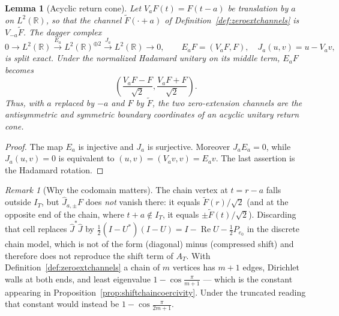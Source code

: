 \documentclass[11pt]{amsart}
\newtheorem{lemma}[theorem]{Lemma}
\theoremstyle{definition}
\theoremstyle{remark}
\newtheorem{remark}[theorem]{Remark}
\begin{document}
\begin{lemma}[Acyclic return cone]\label{lem:acyclicreturncone}
Let $V_aF(t)=F(t-a)$ be translation by $a$ on $L^2(\mathbb R)$, so that the
channel $\widetilde F(\cdot+a)$ of Definition~\ref{def:zeroextchannels} is
$V_{-a}\widetilde F$.  The dagger
complex
\[
 0\longrightarrow L^2(\mathbb R)
 \xrightarrow{E_a}L^2(\mathbb R)^{\oplus2}
 \xrightarrow{J_a}L^2(\mathbb R)\longrightarrow0,
 \qquad
 E_aF=(V_aF,F),\quad J_a(u,v)=u-V_av,
\]
is split exact.  Under the normalized Hadamard unitary on its middle term,
$E_aF$ becomes
\[
 \left(\frac{V_aF-F}{\sqrt2},
       \frac{V_aF+F}{\sqrt2}\right).
\]
Thus, with $a$ replaced by $-a$ and $F$ by $\widetilde F$, the two
zero-extension channels are the antisymmetric and symmetric
boundary coordinates of an acyclic unitary return cone.
\end{lemma}

\begin{proof}
The map $E_a$ is injective and $J_a$ is surjective.  Moreover
$J_aE_a=0$, while $J_a(u,v)=0$ is equivalent to
$(u,v)=(V_av,v)=E_av$.  The last assertion is the Hadamard rotation.
\end{proof}

\begin{remark}[Why the codomain matters]\label{rem:codomainmatters}
The chain vertex at \(t=r-a\) falls outside \(I_T\), but
\(\widehat J_{a,\pm}F\) does \emph{not} vanish there: it equals
\(\widetilde F(r)/\sqrt2\) (and at the opposite end of the chain, where
\(t+a\notin I_T\), it equals \(\pm\widetilde F(t)/\sqrt2\)).  Discarding that cell replaces
\(\widehat J^*\widehat J\) by
\(\tfrac12(I-U^*)(I-U)=I-\operatorname{Re}U-\tfrac12P_{e_0}\) in the discrete
chain model, which is not of the form (diagonal) minus
(compressed shift) and therefore does not reproduce the shift term of
\(A_T\).  With Definition~\ref{def:zeroextchannels} a chain of \(m\) vertices
has \(m+1\) edges, Dirichlet walls at both ends, and least eigenvalue
\(1-\cos\frac{\pi}{m+1}\) --- which is the constant appearing in
Proposition~\ref{prop:shiftchaincoercivity}.  Under the truncated reading that
constant would instead be \(1-\cos\frac{\pi}{2m+1}\).
\end{remark}
\end{document}
